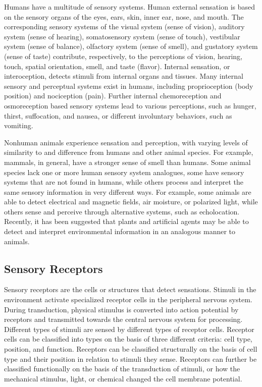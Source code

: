 Humans have a multitude of sensory systems. Human external sensation is
based on the sensory organs of the eyes, ears, skin, inner ear, nose,
and mouth. The corresponding sensory systems of the visual system (sense
of vision), auditory system (sense of hearing), somatosensory system
(sense of touch), vestibular system (sense of balance), olfactory system
(sense of smell), and gustatory system (sense of taste) contribute,
respectively, to the perceptions of vision, hearing, touch, spatial
orientation, smell, and taste (flavor). Internal sensation, or
interoception, detects stimuli from internal organs and tissues. Many
internal sensory and perceptual systems exist in humans, including
proprioception (body position) and nociception (pain). Further internal
chemoreception and osmoreception based sensory systems lead to various
perceptions, such as hunger, thirst, suffocation, and nausea, or
different involuntary behaviors, such as vomiting.

Nonhuman animals experience sensation and perception, with varying
levels of similarity to and difference from humans and other animal
species. For example, mammals, in general, have a stronger sense of
smell than humans. Some animal species lack one or more human sensory
system analogues, some have sensory systems that are not found in
humans, while others process and interpret the same sensory information
in very different ways. For example, some animals are able to detect
electrical and magnetic fields, air moisture, or polarized light, while
others sense and perceive through alternative systems, such as
echolocation. Recently, it has been suggested that plants and artificial
agents may be able to detect and interpret environmental information in
an analogous manner to animals.

\hypertarget{sensory-receptors}{%
\subsection{Sensory Receptors}\label{sensory-receptors}}

Sensory receptors are the cells or structures that detect sensations.
Stimuli in the environment activate specialized receptor cells in the
peripheral nervous system. During transduction, physical stimulus is
converted into action potential by receptors and transmitted towards the
central nervous system for processing. Different types of stimuli are
sensed by different types of receptor cells. Receptor cells can be
classified into types on the basis of three different criteria: cell
type, position, and function. Receptors can be classified structurally
on the basis of cell type and their position in relation to stimuli they
sense. Receptors can further be classified functionally on the basis of
the transduction of stimuli, or how the mechanical stimulus, light, or
chemical changed the cell membrane potential.

